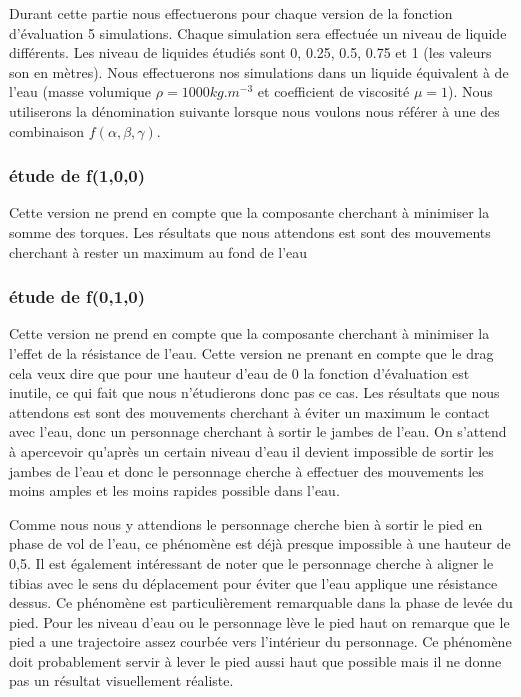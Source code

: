 \documentclass{llncs}
\begin{document}
Durant cette partie nous effectuerons pour chaque version de la fonction d'évaluation 5 simulations. Chaque simulation sera effectuée un niveau de liquide différents. Les niveau de liquides étudiés sont 0, 0.25, 0.5, 0.75 et 1 (les valeurs son en mètres). Nous effectuerons nos simulations dans un liquide équivalent à de l'eau (masse volumique $\rho =1000kg.m^{-3}$ et coefficient de viscosité  $\mu =1$). Nous utiliserons la dénomination suivante lorsque nous voulons nous référer à une des combinaison $f(\alpha,\beta,\gamma)$.

\subsubsection{étude de f(1,0,0)}
Cette version ne prend en compte que la composante cherchant à minimiser la somme des torques. Les résultats que nous attendons est sont des mouvements cherchant à rester un maximum au fond de l'eau 

\subsubsection{étude de f(0,1,0)}
Cette version ne prend en compte que la composante cherchant à minimiser la l'effet de la résistance de l'eau. Cette version ne prenant en compte que le drag cela veux dire que pour une hauteur d'eau de 0 la fonction d'évaluation est inutile, ce qui fait que nous n'étudierons donc pas ce cas. Les résultats que nous attendons est sont des mouvements cherchant à éviter un maximum le contact avec l'eau, donc un personnage cherchant à sortir le jambes de l'eau. On s'attend à apercevoir qu'après un certain niveau d'eau il devient impossible de sortir les jambes de l'eau et donc le personnage cherche à effectuer des mouvements les moins amples et les moins rapides possible dans l'eau. 
 
Comme nous nous y attendions le personnage cherche bien à sortir le pied en phase de vol de l'eau, ce phénomène est déjà presque impossible à une hauteur de 0,5. Il est également intéressant de noter que le personnage cherche à aligner le tibias avec le sens du déplacement pour éviter que l'eau applique une résistance dessus. Ce phénomène est particulièrement remarquable dans la phase de levée du pied. Pour les niveau d'eau ou le personnage lève le pied haut on remarque que le pied a une trajectoire assez courbée vers l'intérieur du personnage. Ce phénomène doit probablement servir à lever le pied aussi haut que possible mais il ne donne pas un résultat visuellement réaliste.  
\end{document}
